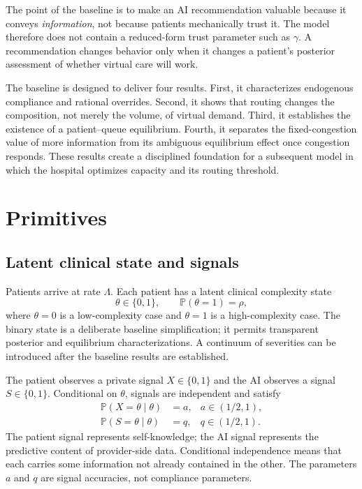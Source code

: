 \documentclass[11pt]{article}
\newcommand{\Prb}{\mathbb{P}}
\begin{document}
The point of the baseline is to make an AI recommendation valuable because it conveys \emph{information}, not because patients mechanically trust it.  The model therefore does not contain a reduced-form trust parameter such as $\gamma$.  A recommendation changes behavior only when it changes a patient's posterior assessment of whether virtual care will work.

The baseline is designed to deliver four results.  First, it characterizes endogenous compliance and rational overrides.  Second, it shows that routing changes the composition, not merely the volume, of virtual demand.  Third, it establishes the existence of a patient--queue equilibrium.  Fourth, it separates the fixed-congestion value of more information from its ambiguous equilibrium effect once congestion responds.  These results create a disciplined foundation for a subsequent model in which the hospital optimizes capacity and its routing threshold.

\section{Primitives}

\subsection{Latent clinical state and signals}

Patients arrive at rate $\Lambda$.  Each patient has a latent clinical complexity state
\[
 \theta\in\{0,1\},\qquad \Prb(\theta=1)=\rho,
\]
where $\theta=0$ is a low-complexity case and $\theta=1$ is a high-complexity case.  The binary state is a deliberate baseline simplification; it permits transparent posterior and equilibrium characterizations.  A continuum of severities can be introduced after the baseline results are established.

The patient observes a private signal $X\in\{0,1\}$ and the AI observes a signal $S\in\{0,1\}$.  Conditional on $\theta$, signals are independent and satisfy
\begin{align}
 \Prb(X=\theta\mid\theta)&=a, & a\in(1/2,1),\\
 \Prb(S=\theta\mid\theta)&=q, & q\in(1/2,1).
 \label{eq:accuracies}
\end{align}
The patient signal represents self-knowledge; the AI signal represents the predictive content of provider-side data.  Conditional independence means that each carries some information not already contained in the other.  The parameters $a$ and $q$ are signal accuracies, not compliance parameters.
\end{document}
